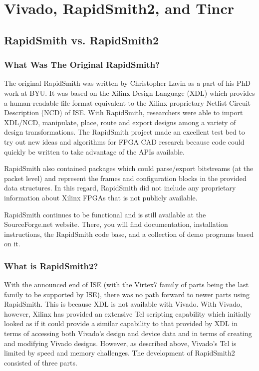 \newpage
\section{Vivado, RapidSmith2, and Tincr}
\subsection{RapidSmith vs. RapidSmith2}
\subsubsection{What Was The Original RapidSmith?}
The original RapidSmith was written by Christopher Lavin as a part of his PhD
work at BYU.  It was based on the Xilinx Design Language (XDL) which provides a
human-readable file format equivalent to the Xilinx proprietary Netlist Circuit
Description (NCD) of ISE.  With RapidSmith, researchers were able to import
XDL/NCD, manipulate, place, route and export designs among a variety of design
transformations.  The RapidSmith project made an excellent test bed to try out
new ideas and algorithms for FPGA CAD research because code could quickly be
written to take advantage of the APIs available.

RapidSmith also contained packages which could parse/export bitstreams (at the
packet level) and represent the frames and configuration blocks in the provided
data structures.  In this regard, RapidSmith did not include any proprietary
information about Xilinx FPGAs that is not publicly available.

RapidSmith continues to be functional and is still available at the
SourceForge.net website.  There, you will find documentation, installation
instructions, the RapidSmith code base, and a collection of demo programs based
on it.

\subsubsection{What is RapidSmith2?}
With the announced end of ISE (with the Virtex7 family of parts being the last
family to be supported by ISE), there was no path forward to newer parts using
RapidSmith.  This is because XDL is not available with Vivado. With
Vivado, however, Xilinx has provided an extensive Tcl scripting capability which 
initially looked as if it could provide a similar capability to that provided by
XDL in terms of accessing both Vivado's design and device data and in terms of
creating and modifying Vivado designs.  However, as described above, Vivado's
Tcl is limited by speed and memory challenges.
The development of RapidSmith2 consisted of three parts.

